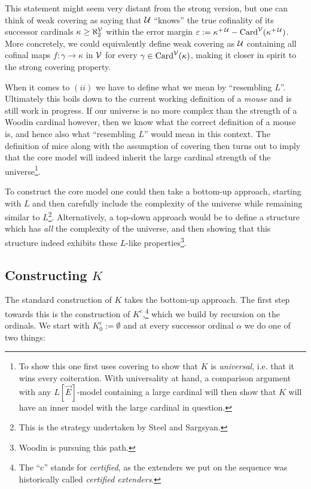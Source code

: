 \documentclass[../../main]{subfiles}
\begin{document}
This statement might seem very distant from the strong version, but one can think of weak covering as saying that $\operatorname{\mathcal U}$ ``knows'' the true cofinality of its successor cardinals $\kappa\geq\aleph_2^{\operatorname{\mathcal V}}$ within the error margin $\varepsilon:=\kappa^{+\operatorname{\mathcal U}}-\operatorname{Card}^{\operatorname{\mathcal V}}(\kappa^{+\operatorname{\mathcal U}})$. More concretely, we could equivalently define weak covering as $\operatorname{\mathcal U}$ containing all cofinal maps $f\colon\gamma\to\kappa$ in $\operatorname{\mathcal V}$ for every $\gamma\in\operatorname{Card}^{\operatorname{\mathcal V}}(\kappa)$, making it closer in spirit to the strong covering property.



\qquad When it comes to $(ii)$ we have to define what we mean by ``resembling $L$''. Ultimately this boils down to the current working definition of a \textit{mouse} and is still work in progress. If our universe is no more complex than the strength of a Woodin cardinal however, then we know what the correct definition of a mouse is, and hence also what ``resembling $L$'' would mean in this context. The definition of mice along with the assumption of covering then turns out to imply that the core model will indeed inherit the large cardinal strength of the universe\footnote{To show this one first uses covering to show that $K$ is \textit{universal}, i.e. that it wins every coiteration. With universality at hand, a comparison argument with any $L[\vec E]$-model containing a large cardinal will then show that $K$ will have an inner model with the large cardinal in question.}.

\qquad To construct the core model one could then take a bottom-up approach, starting with $L$ and then carefully include the complexity of the universe while remaining similar to $L$\footnote{This is the strategy undertaken by Steel and Sargsyan.}. Alternatively, a top-down approach would be to define a structure which has \textit{all} the complexity of the universe, and then showing that this structure indeed exhibits these $L$-like properties\footnote{Woodin is pursuing this path.}.

\subsection{Constructing $K$}

The standard construction of $K$ takes the bottom-up approach. The first step towards this is the construction of $K^c$,\footnote{The ``c'' stands for \textit{certified}, as the extenders we put on the sequence was historically called \textit{certified extenders}.} which we build by recursion on the ordinals. We start with $K^c_0 := \emptyset$ and at every successor ordinal $\alpha$ we do one of two things:
\end{document}
